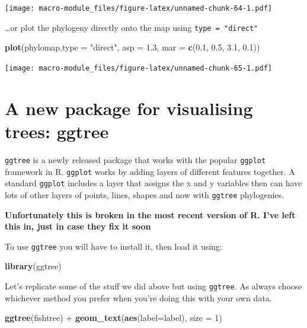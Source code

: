 \documentclass[]{book}
\newenvironment{Shaded}{\begin{snugshade}}{\end{snugshade}}
\newcommand{\KeywordTok}[1]{\textcolor[rgb]{0.13,0.29,0.53}{\textbf{{#1}}}}
\newcommand{\DataTypeTok}[1]{\textcolor[rgb]{0.13,0.29,0.53}{{#1}}}
\newcommand{\DecValTok}[1]{\textcolor[rgb]{0.00,0.00,0.81}{{#1}}}
\newcommand{\FloatTok}[1]{\textcolor[rgb]{0.00,0.00,0.81}{{#1}}}
\newcommand{\StringTok}[1]{\textcolor[rgb]{0.31,0.60,0.02}{{#1}}}
\newcommand{\NormalTok}[1]{{#1}}
\theoremstyle{definition}
\theoremstyle{definition}
\theoremstyle{definition}
\theoremstyle{remark}
\begin{document}
\texttt{[image: macro-module\_files/figure-latex/unnamed-chunk-64-1.pdf]}

\ldots{}or plot the phylogeny directly onto the map using
\texttt{type\ =\ "direct"}

\begin{Shaded}
\begin{Highlighting}[]
\KeywordTok{plot}\NormalTok{(phylomap,}\DataTypeTok{type =} \StringTok{"direct"}\NormalTok{, }\DataTypeTok{asp =} \FloatTok{1.3}\NormalTok{, }\DataTypeTok{mar =} \KeywordTok{c}\NormalTok{(}\FloatTok{0.1}\NormalTok{, }\FloatTok{0.5}\NormalTok{, }\FloatTok{3.1}\NormalTok{, }\FloatTok{0.1}\NormalTok{))}
\end{Highlighting}
\end{Shaded}

\texttt{[image: macro-module\_files/figure-latex/unnamed-chunk-65-1.pdf]}

\section{A new package for visualising trees:
ggtree}\label{a-new-package-for-visualising-trees-ggtree}

\texttt{ggtree} is a newly released package that works with the popular
\texttt{ggplot} framework in R. \texttt{ggplot} works by adding layers
of different features together. A standard \texttt{ggplot} includes a
layer that assigns the x and y variables then can have lots of other
layers of points, lines, shapes and now with \texttt{ggtree}
phylogenies.

\textbf{Unfortunately this is broken in the most recent version of R.
I've left this in, just in case they fix it soon}

To use \texttt{ggtree} you will have to install it, then load it using:

\begin{Shaded}
\begin{Highlighting}[]
\KeywordTok{library}\NormalTok{(ggtree)}
\end{Highlighting}
\end{Shaded}

Let's replicate some of the stuff we did above but using
\texttt{ggtree}. As always choose whichever method you prefer when
you're doing this with your own data.

\begin{Shaded}
\begin{Highlighting}[]
\KeywordTok{ggtree}\NormalTok{(fishtree) +}
\KeywordTok{geom_text}\NormalTok{(}\KeywordTok{aes}\NormalTok{(}\DataTypeTok{label=}\NormalTok{label), }\DataTypeTok{size =} \DecValTok{1}\NormalTok{)}
\end{Highlighting}
\end{Shaded}
\end{document}
